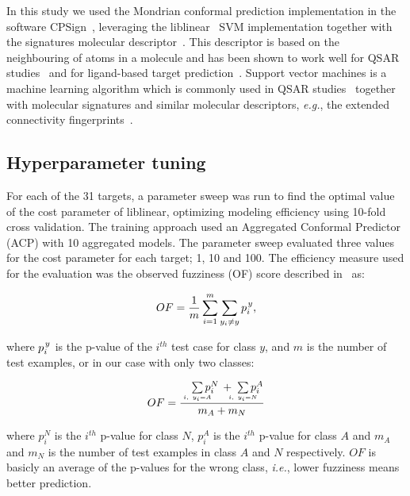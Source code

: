 \documentclass[utf8]{frontiersSCNS} %
\begin{document}
In this study we used the Mondrian conformal prediction implementation in the
software CPSign~\cite{CPSignDocs}, leveraging the
liblinear~\cite{fan2008liblinear} SVM implementation together with the
signatures molecular descriptor~\cite{faulon2003signature}.  This descriptor is
based on the neighbouring of atoms in a molecule and has been shown to work
well for QSAR studies~\cite{lapins2018confidence,Alvarsson:2016pw} and for
ligand-based target prediction~\cite{alvarsson2014ligand}. Support vector
machines is a machine learning algorithm which is commonly used in QSAR
studies~\cite{norinder2003support,zhou2011qsar} together with molecular
signatures and similar molecular descriptors, \textit{e.g.}, the extended
connectivity fingerprints~\cite{rogers2010extended}.


\subsection{Hyperparameter tuning}
For each of the 31 targets, a parameter sweep was run to find the optimal value
of the cost parameter of liblinear, optimizing modeling efficiency using
10-fold cross validation. The training approach used an Aggregated Conformal
Predictor (ACP) with 10 aggregated models.  The parameter sweep evaluated three
values for the cost parameter for each target; 1, 10 and 100. The efficiency
measure used for the evaluation was the observed fuzziness (OF) score described
in~\cite{Vovk2016} as:

\begin{equation}
OF =\frac{ 1}{m} \sum\limits_{i=1}^{m} \sum\limits_{y_i \neq y }  p_i^{\kern1pt y},		
\end{equation}

where $p_i^{\kern1pt y}$ is the p-value of the $i^{th}$ test case for class $y$, and $m$ is the number of test examples, or in our case with only two classes:

\begin{equation}
OF =  \frac
        {\quad\sum\limits_{\mathclap{\substack{\scriptscriptstyle i,\ y_i=A}}}p_i^N \, + \;\sum\limits_{\mathclap{\substack{\scriptscriptstyle i,\ y_i=N}}}p_i^A}
        {m_A + m_N}
\end{equation}

where $p_i^N$ is the $i^{th}$ p-value for class $N$, $p_i^A$ is the $i^{th}$
p-value for class $A$ and $m_A$ and $m_N$ is the number of test examples in
class $A$ and $N$ respectively. $OF$ is basicly an average of the p-values for
the wrong class, \textit{i.e.}, lower fuzziness means better prediction.
\end{document}
